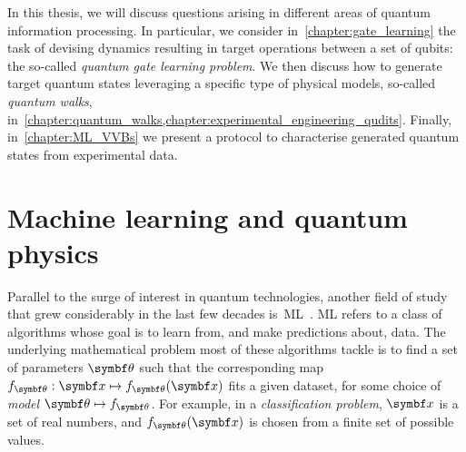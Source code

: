 In this thesis, we will discuss questions arising in different areas of quantum information processing.
In particular, we consider in~\cref{chapter:gate_learning} the task of devising dynamics resulting in target operations between a set of qubits: the so-called \emph{quantum gate learning problem}.
We then discuss how to generate target quantum states leveraging a specific type of physical models, so-called \emph{quantum walks}, in~\cref{chapter:quantum_walks,chapter:experimental_engineering_qudits}.
Finally, in~\cref{chapter:ML_VVBs} we present a protocol to characterise generated quantum states from experimental data.

\section{Machine learning and quantum physics}
\label{sec:intro:ML}

Parallel to the surge of interest in quantum technologies, another field of study that grew considerably in the last few decades is~\ac{ML}~\cite{friedman2001elements,you2011atomic,bishop2006pattern,abu2012learning,murphy2012machine,mehta2019highbias}.
\ac{ML} refers to a class of algorithms whose goal is to learn from, and make predictions about, data.
The underlying mathematical problem most of these algorithms tackle is to find a set of parameters $\bstheta$ such that the corresponding map $f_\bstheta:\bs x\mapsto f_\bstheta(\bs x)$ fits a given dataset, for some choice of \emph{model} $\bstheta\mapsto f_\bstheta$.
For example, in a \emph{classification problem}, $\bs x$ is a set of real numbers, and $f_\bstheta(\bs x)$ is chosen from a finite set of possible values.



